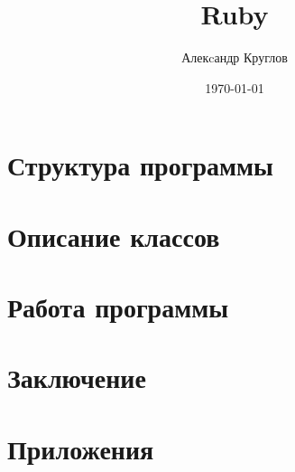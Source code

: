 \documentclass[a4paper, 12pt, oneside, openany, book]{ncc}
\begin{document}
\author{Алекcандр Круглов}
\title{Ruby}
\date{\today}
\maketitle

{\frontmatter

\tableofcontents}

{\mainmatter
{\part{Структура программы}




}

{\part{Описание классов}







}

{\part{Работа программы}







}}

{\part{Заключение}
}

{\appendix
\part{Приложения}








}
\end{document}
